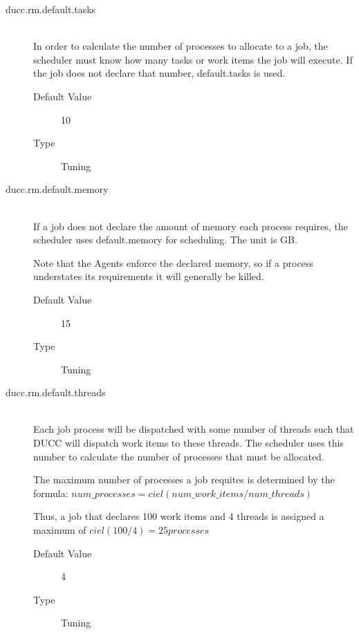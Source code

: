 \begin{description}
        \item[ducc.rm.default.tasks] \hfill \\
          In order to calculate the number of processes to allocate to a job, the scheduler must know 
          how many tasks or work items the job will execute. If the job does not declare that number, 
          default.tasks is used. 
          \begin{description}
            \item[Default Value] 10 
            \item[Type] Tuning 
          \end{description}
          
        \item[ducc.rm.default.memory] \hfill \\
          If a job does not declare the amount of memory each process requires, the scheduler uses 
          default.memory for scheduling. The unit is GB. 

          Note that the Agents enforce the declared memory, so if a process understates its 
          requirements it will generally be killed. 
          \begin{description}
            \item[Default Value] 15 
            \item[Type] Tuning 
          \end{description}
          
        \item[ducc.rm.default.threads] \hfill \\
          Each job process will be dispatched with some number of threads such that DUCC will 
          dispatch work items to these threads. The scheduler uses this number to calculate the 
          number of processes that must be allocated. 

          The maximum number of processes a job requites is determined by the formula:           
          $num\_processes = ciel(num\_work\_items / num\_threads)$ 
          
          Thus, a job that declares 100 work items and 4 threads is assigned a maximum of          
          $ciel(100/4) = 25 processes$
          
          \begin{description}
            \item[Default Value] 4 
            \item[Type] Tuning 
          \end{description}
          

\end{description}
